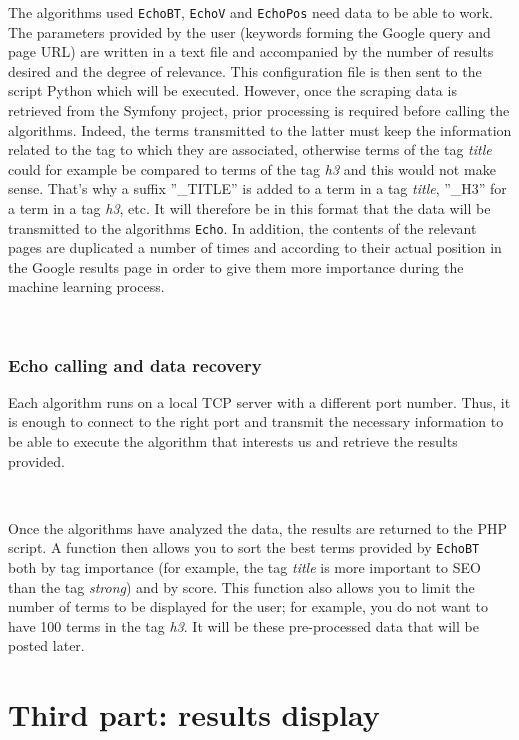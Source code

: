 \documentclass[12pt]{article}
\begin{document}
The algorithms used \texttt{EchoBT}, \texttt{EchoV} and \texttt{EchoPos} need data to be able to work. The parameters provided by the user (keywords forming the Google query and page URL) are written in a text file and accompanied by the number of results desired and the degree of relevance. This configuration file is then sent to the script \textsf{Python} which will be executed. However, once the scraping data is retrieved from the \textsf{Symfony} project, prior processing is required before calling the algorithms. Indeed, the terms transmitted to the latter must keep the information related to the tag to which they are associated, otherwise terms of the tag \textit{title} could for example be compared to terms of the tag \textit{h3} and this would not make sense. That's why a suffix ''\_TITLE'' is added to a term in a tag \textit{title}, ''\_H3'' for a term in a tag \textit{h3}, etc. It will therefore be in this format that the data will be transmitted to the algorithms \texttt{Echo}. In addition, the contents of the relevant pages are duplicated a number of times and according to their actual position in the Google results page in order to give them more importance during the machine learning process.

\

\subsubsection{Echo calling and data recovery}

Each algorithm runs on a local TCP server with a different port number. Thus, it is enough to connect to the right port and transmit the necessary information to be able to execute the algorithm that interests us and retrieve the results provided.

\

Once the algorithms have analyzed the data, the results are returned to the \textsf{PHP} script. A function then allows you to sort the best terms provided by \texttt{EchoBT} both by tag importance (for example, the tag \textit{title} is more important to SEO than the tag \textit{strong}) and by score. This function also allows you to limit the number of terms to be displayed for the user; for example, you do not want to have 100 terms in the tag \textit{h3}. It will be these pre-processed data that will be posted later.


\newpage
\section{Third part: results display}
\end{document}
